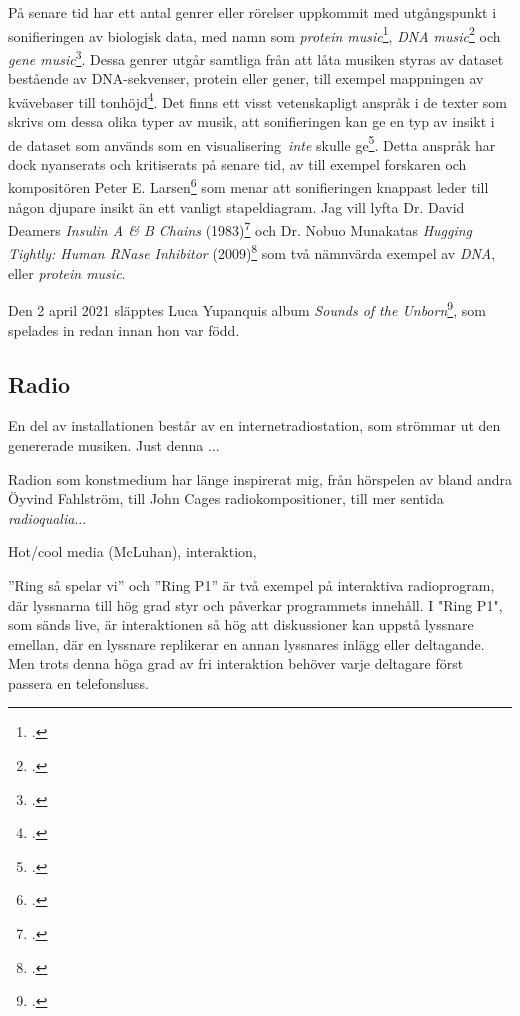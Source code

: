 \documentclass[11pt, a4paper]{article} %
\begin{document}
På senare tid har ett antal genrer eller rörelser uppkommit med utgångspunkt i sonifieringen av biologisk data, med namn som \emph{protein music}\footcite{king_pm_1996}, \emph{DNA music}\footcite{k_kawazoe_study_2001} och \emph{gene music}\footcite{munakata_gene_1995}. Dessa genrer utgår samtliga från att låta musiken styras av dataset bestående av DNA-sekvenser, protein eller gener, till exempel mappningen av kvävebaser till tonhöjd\footcite{shi_electronic_2007}. Det finns ett visst vetenskapligt anspråk i de texter som skrivs om dessa olika typer av musik, att sonifieringen kan ge en typ av insikt i de dataset som används som en visualisering \emph{inte} skulle ge\footcite{king_pm_1996}. Detta anspråk har dock nyanserats och kritiserats på senare tid, av till exempel forskaren och kompositören Peter E. Larsen\footcite{larsen_more_2016} som menar att sonifieringen knappast leder till någon djupare insikt än ett vanligt stapeldiagram. Jag vill lyfta Dr. David Deamers \emph{Insulin A \& B Chains} (1983)\footcite{deamer_insulin_1983} och Dr. Nobuo Munakatas \emph{Hugging Tightly: Human RNase Inhibitor} (2009)\footcite{munakata_hugging_2009} som två nämnvärda exempel av \emph{DNA}, eller \emph{protein music}.

Den 2 april 2021 släpptes Luca Yupanquis album \emph{Sounds of the Unborn}\footcite{yupanqui_sounds_2021}, som spelades in redan innan hon var född. 


\subsection*{Radio}
En del av installationen består av en internetradiostation, som strömmar ut den genererade musiken. Just denna ...

Radion som konstmedium har länge inspirerat mig, från hörspelen av bland andra Öyvind Fahlström, till John Cages radiokompositioner, till mer sentida \emph{radioqualia}... 

Hot/cool media (McLuhan), interaktion, 

''Ring så spelar vi'' och ''Ring P1'' är två exempel på interaktiva radioprogram, där lyssnarna till hög grad styr och påverkar programmets innehåll. I "Ring P1", som sänds live, är interaktionen så hög att diskussioner kan uppstå lyssnare emellan, där en lyssnare replikerar en annan lyssnares inlägg eller deltagande. Men trots denna höga grad av fri interaktion behöver varje deltagare först passera en telefonsluss. 
\end{document}
